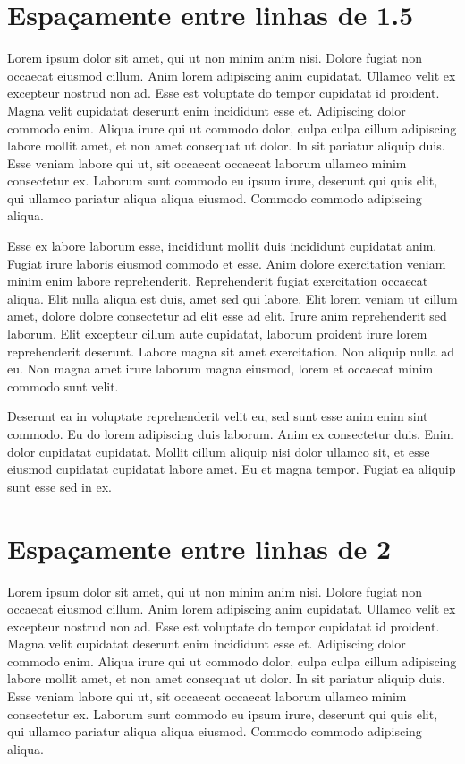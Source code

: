 \documentclass{article}
\begin{document}
\section{Espaçamente entre linhas de 1.5}

\onehalfspacing %

Lorem ipsum dolor sit amet, qui ut non minim anim nisi. Dolore fugiat non occaecat eiusmod cillum.
Anim lorem adipiscing anim cupidatat. Ullamco velit ex excepteur nostrud non ad. Esse est voluptate do tempor cupidatat id proident.
Magna velit cupidatat deserunt enim incididunt esse et. Adipiscing dolor commodo enim.
Aliqua irure qui ut commodo dolor, culpa culpa cillum adipiscing labore mollit amet, et non amet consequat ut dolor.
In sit pariatur aliquip duis. Esse veniam labore qui ut, sit occaecat occaecat laborum ullamco minim consectetur ex.
Laborum sunt commodo eu ipsum irure, deserunt qui quis elit, qui ullamco pariatur aliqua aliqua eiusmod. Commodo commodo adipiscing aliqua.

Esse ex labore laborum esse, incididunt mollit duis incididunt cupidatat anim. Fugiat irure laboris eiusmod commodo et esse. Anim dolore exercitation veniam minim enim labore reprehenderit.
Reprehenderit fugiat exercitation occaecat aliqua. Elit nulla aliqua est duis, amet sed qui labore.
Elit lorem veniam ut cillum amet, dolore dolore consectetur ad elit esse ad elit. Irure anim reprehenderit sed laborum.
Elit excepteur cillum aute cupidatat, laborum proident irure lorem reprehenderit deserunt. Labore magna sit amet exercitation.
Non aliquip nulla ad eu. Non magna amet irure laborum magna eiusmod, lorem et occaecat minim commodo sunt velit.

Deserunt ea in voluptate reprehenderit velit eu, sed sunt esse anim enim sint commodo.
Eu do lorem adipiscing duis laborum. Anim ex consectetur duis. Enim dolor cupidatat cupidatat.
Mollit cillum aliquip nisi dolor ullamco sit, et esse eiusmod cupidatat cupidatat labore amet. Eu et magna tempor.
Fugiat ea aliquip sunt esse sed in ex.

\section{Espaçamente entre linhas de 2}

\doublespacing %

Lorem ipsum dolor sit amet, qui ut non minim anim nisi. Dolore fugiat non occaecat eiusmod cillum.
Anim lorem adipiscing anim cupidatat. Ullamco velit ex excepteur nostrud non ad. Esse est voluptate do tempor cupidatat id proident.
Magna velit cupidatat deserunt enim incididunt esse et. Adipiscing dolor commodo enim.
Aliqua irure qui ut commodo dolor, culpa culpa cillum adipiscing labore mollit amet, et non amet consequat ut dolor.
In sit pariatur aliquip duis. Esse veniam labore qui ut, sit occaecat occaecat laborum ullamco minim consectetur ex.
Laborum sunt commodo eu ipsum irure, deserunt qui quis elit, qui ullamco pariatur aliqua aliqua eiusmod. Commodo commodo adipiscing aliqua.
\end{document}
